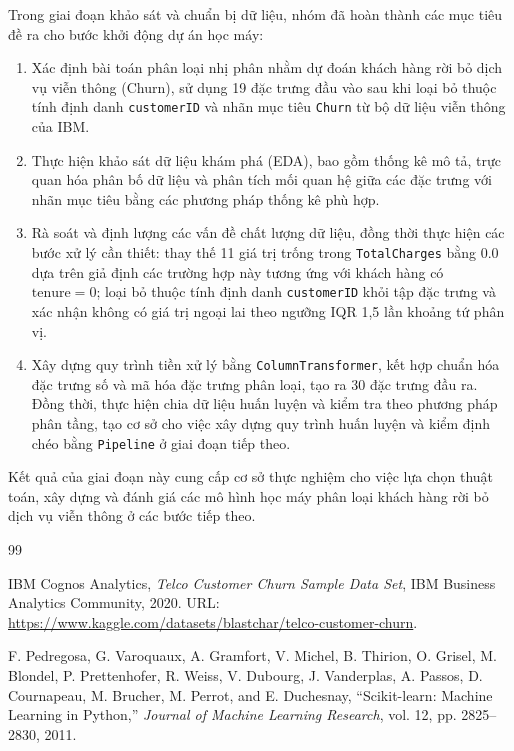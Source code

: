 \documentclass[a4paper]{article}
\begin{document}
{Trong giai đoạn khảo sát và chuẩn bị dữ liệu, nhóm đã hoàn thành các mục tiêu đề ra cho bước khởi động dự án học máy:
\begin{enumerate}
    \item Xác định bài toán phân loại nhị phân nhằm dự đoán khách hàng rời bỏ dịch vụ viễn thông (Churn), sử dụng 19 đặc trưng đầu vào sau khi loại bỏ thuộc tính định danh \texttt{customerID} và nhãn mục tiêu \texttt{Churn} từ bộ dữ liệu viễn thông của IBM.
    \item Thực hiện khảo sát dữ liệu khám phá (EDA), bao gồm thống kê mô tả, trực quan hóa phân bố dữ liệu và phân tích mối quan hệ giữa các đặc trưng với nhãn mục tiêu bằng các phương pháp thống kê phù hợp.
    \item Rà soát và định lượng các vấn đề chất lượng dữ liệu, đồng thời thực hiện các bước xử lý cần thiết: thay thế 11 giá trị trống trong \texttt{TotalCharges} bằng 0.0 dựa trên giả định các trường hợp này tương ứng với khách hàng có $\text{tenure} = 0$; loại bỏ thuộc tính định danh \texttt{customerID} khỏi tập đặc trưng và xác nhận không có giá trị ngoại lai theo ngưỡng IQR 1,5 lần khoảng tứ phân vị.
    \item Xây dựng quy trình tiền xử lý bằng \texttt{ColumnTransformer}, kết hợp chuẩn hóa đặc trưng số và mã hóa đặc trưng phân loại, tạo ra 30 đặc trưng đầu ra. Đồng thời, thực hiện chia dữ liệu huấn luyện và kiểm tra theo phương pháp phân tầng, tạo cơ sở cho việc xây dựng quy trình huấn luyện và kiểm định chéo bằng \texttt{Pipeline} ở giai đoạn tiếp theo.
\end{enumerate}

Kết quả của giai đoạn này cung cấp cơ sở thực nghiệm cho việc lựa chọn thuật toán, xây dựng và đánh giá các mô hình học máy phân loại khách hàng rời bỏ dịch vụ viễn thông ở các bước tiếp theo.

\vspace{1.5em}
\begin{thebibliography}{99}

IBM Cognos Analytics, \textit{Telco Customer Churn Sample Data Set}, IBM Business Analytics Community, 2020. URL: \url{https://www.kaggle.com/datasets/blastchar/telco-customer-churn}.

F. Pedregosa, G. Varoquaux, A. Gramfort, V. Michel, B. Thirion, O. Grisel, M. Blondel, P. Prettenhofer, R. Weiss, V. Dubourg, J. Vanderplas, A. Passos, D. Cournapeau, M. Brucher, M. Perrot, and E. Duchesnay, ``Scikit-learn: Machine Learning in Python,'' \textit{Journal of Machine Learning Research}, vol. 12, pp. 2825--2830, 2011.


\end{thebibliography}}
\end{document}
